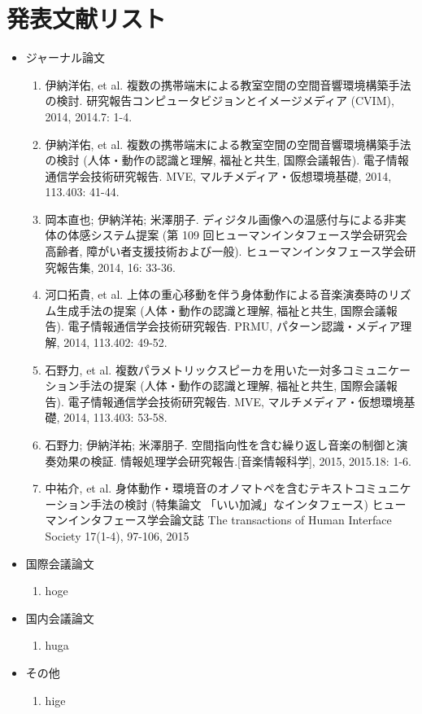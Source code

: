 \chapter*{発表文献リスト}

\begin{itemize}

  \item[] ジャーナル論文
  \begin{enumerate}
    \item 伊納洋佑, et al. 複数の携帯端末による教室空間の空間音響環境構築手法の検討. 研究報告コンピュータビジョンとイメージメディア (CVIM), 2014, 2014.7: 1-4.
    \item 伊納洋佑, et al. 複数の携帯端末による教室空間の空間音響環境構築手法の検討 (人体・動作の認識と理解, 福祉と共生, 国際会議報告). 電子情報通信学会技術研究報告. MVE, マルチメディア・仮想環境基礎, 2014, 113.403: 41-44.
    \item 岡本直也; 伊納洋祐; 米澤朋子. ディジタル画像への温感付与による非実体の体感システム提案 (第 109 回ヒューマンインタフェース学会研究会 高齢者, 障がい者支援技術および一般). ヒューマンインタフェース学会研究報告集, 2014, 16: 33-36.
    \item 河口拓貴, et al. 上体の重心移動を伴う身体動作による音楽演奏時のリズム生成手法の提案 (人体・動作の認識と理解, 福祉と共生, 国際会議報告). 電子情報通信学会技術研究報告. PRMU, パターン認識・メディア理解, 2014, 113.402: 49-52.
    \item 石野力, et al. 複数パラメトリックスピーカを用いた一対多コミュニケーション手法の提案 (人体・動作の認識と理解, 福祉と共生, 国際会議報告). 電子情報通信学会技術研究報告. MVE, マルチメディア・仮想環境基礎, 2014, 113.403: 53-58.
    \item 石野力; 伊納洋祐; 米澤朋子. 空間指向性を含む繰り返し音楽の制御と演奏効果の検証. 情報処理学会研究報告.[音楽情報科学], 2015, 2015.18: 1-6.
    \item 中祐介, et al. 身体動作・環境音のオノマトペを含むテキストコミュニケーション手法の検討 (特集論文 「いい加減」なインタフェース) ヒューマンインタフェース学会論文誌 The transactions of Human Interface Society 17(1-4), 97-106, 2015
  \end{enumerate}

  \item[] 国際会議論文
  \begin{enumerate}
    \item hoge
  \end{enumerate}

  \item[] 国内会議論文
  \begin{enumerate}
    \item huga
  \end{enumerate}

  \item[] その他
  \begin{enumerate}
    \item hige
  \end{enumerate}

\end{itemize}
